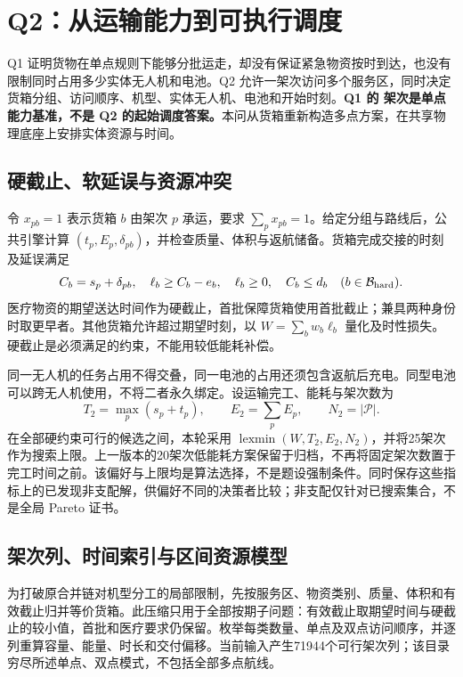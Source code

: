 \section{Q2：从运输能力到可执行调度}\label{sec:q2}
Q1 证明货物在单点规则下能够分批运走，却没有保证紧急物资按时到达，也没有限制同时占用多少实体无人机和电池。Q2 允许一架次访问多个服务区，同时决定货箱分组、访问顺序、机型、实体无人机、电池和开始时刻。\textbf{Q1 的 \QOneTrips{} 架次是单点能力基准，不是 Q2 的起始调度答案。}本问从货箱重新构造多点方案，在共享物理底座上安排实体资源与时间。

\subsection{硬截止、软延误与资源冲突}
令 $x_{pb}=1$ 表示货箱 $b$ 由架次 $p$ 承运，要求 $\sum_px_{pb}=1$。给定分组与路线后，公共引擎计算 $(t_p,E_p,\delta_{pb})$，并检查质量、体积与返航储备。货箱完成交接的时刻及延误满足
\begin{equation}
C_b=s_p+\delta_{pb},\quad \ell_b\ge C_b-e_b,\quad \ell_b\ge0,\quad C_b\le d_b\quad(b\in\mathcal B_{\rm hard}).\label{eq:deadline}
\end{equation}
医疗物资的期望送达时间作为硬截止，首批保障货箱使用首批截止；兼具两种身份时取更早者。其他货箱允许超过期望时刻，以 $W=\sum_bw_b\ell_b$ 量化及时性损失。硬截止是必须满足的约束，不能用较低能耗补偿。

同一无人机的任务占用不得交叠，同一电池的占用还须包含返航后充电。同型电池可以跨无人机使用，不将二者永久绑定。设运输完工、能耗与架次数为
\begin{equation}
T_2=\max_p(s_p+t_p),\qquad E_2=\sum_pE_p,\qquad N_2=|\mathcal P|.\label{eq:q2objective}
\end{equation}
在全部硬约束可行的候选之间，本轮采用 $\operatorname{lexmin}(W,T_2,E_2,N_2)$，并将25架次作为搜索上限。上一版本的20架次低能耗方案保留于归档，不再将固定架次数置于完工时间之前。该偏好与上限均是算法选择，不是题设强制条件。同时保存这些指标上的已发现非支配解，供偏好不同的决策者比较；非支配仅针对已搜索集合，不是全局 Pareto 证书。

\subsection{架次列、时间索引与区间资源模型}
为打破原合并链对机型分工的局部限制，先按服务区、物资类别、质量、体积和有效截止归并等价货箱。此压缩只用于全部按期子问题：有效截止取期望时间与硬截止的较小值，首批和医疗要求仍保留。枚举每类数量、单点及双点访问顺序，并逐列重算容量、能量、时长和交付偏移。当前输入产生71944个可行架次列；该目录穷尽所述单点、双点模式，不包括全部多点航线。

